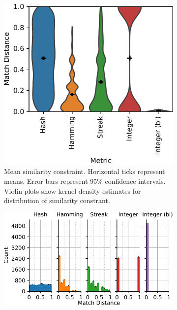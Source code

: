 \begin{figure}[!htbp]
\begin{center}
\begin{subfigure}[b]{\linewidth}
\begin{minipage}{0.6\linewidth}
\includegraphics[width=\linewidth]{img/sphere/bitweight=0dot5+seed=1+title=dimensionality_violinplot+_data_hathash_hash=c0f6c5cf854ff253+_script_fullcat_hash=d1692569f79e33f8+ext=}
\end{minipage}
\begin{minipage}{0.35\linewidth}
\caption{
Mean similarity constraint.
Horizontal ticks represent means.
Error bars represent 95\% confidence intervals.
Violin plots show kernel density estimates for distribution of similarity constrant.
}
\label{fig:sphere_barplot}
\end{minipage}
\end{subfigure}
\begin{minipage}{\linewidth}
\begin{subfigure}[b]{\linewidth}
\centering
\includegraphics[width=\linewidth]{img/sphere/bitweight=0dot5+seed=1+title=dimensionality_distnplot+viz=hist+_data_hathash_hash=c0f6c5cf854ff253+_script_fullcat_hash=cda229fb13f5a152+ext=}

\end{subfigure}
\end{minipage}
\end{center}
\end{figure}
